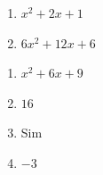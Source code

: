 \begin{respostas}{2}
\begin{multicols}{3}
\begin{enumerate}[label=\alph*)]
            \item $x^2+2x+1$
            
            \item $6x^2+12x+6$
        \end{enumerate}
    \end{multicols}
    
    
    \ansitem{} \begin{multicols}{4}
        \begin{enumerate}[label=\alph*)]
            \item $x^2+6x+9$
            
            \item $16$
            
            \item Sim
            
            \item $-3$
        \end{enumerate}
    \end{multicols}
    
    
\end{respostas}

